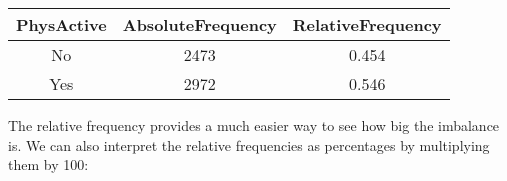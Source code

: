\documentclass[]{book}
\newenvironment{Shaded}{\begin{snugshade}}{\end{snugshade}}
\newcommand{\KeywordTok}[1]{\textcolor[rgb]{0.13,0.29,0.53}{\textbf{#1}}}
\newcommand{\DataTypeTok}[1]{\textcolor[rgb]{0.13,0.29,0.53}{#1}}
\newcommand{\DecValTok}[1]{\textcolor[rgb]{0.00,0.00,0.81}{#1}}
\newcommand{\StringTok}[1]{\textcolor[rgb]{0.31,0.60,0.02}{#1}}
\newcommand{\CommentTok}[1]{\textcolor[rgb]{0.56,0.35,0.01}{\textit{#1}}}
\newcommand{\OperatorTok}[1]{\textcolor[rgb]{0.81,0.36,0.00}{\textbf{#1}}}
\newcommand{\NormalTok}[1]{#1}
\theoremstyle{definition}
\theoremstyle{definition}
\theoremstyle{definition}
\theoremstyle{remark}
\begin{document}
\begin{longtable}[]{@{}ccc@{}}
\toprule
\begin{minipage}[b]{0.16\columnwidth}\centering\strut
PhysActive\strut
\end{minipage} & \begin{minipage}[b]{0.25\columnwidth}\centering\strut
AbsoluteFrequency\strut
\end{minipage} & \begin{minipage}[b]{0.25\columnwidth}\centering\strut
RelativeFrequency\strut
\end{minipage}\tabularnewline
\midrule
\endhead
\begin{minipage}[t]{0.16\columnwidth}\centering\strut
No\strut
\end{minipage} & \begin{minipage}[t]{0.25\columnwidth}\centering\strut
2473\strut
\end{minipage} & \begin{minipage}[t]{0.25\columnwidth}\centering\strut
0.454\strut
\end{minipage}\tabularnewline
\begin{minipage}[t]{0.16\columnwidth}\centering\strut
Yes\strut
\end{minipage} & \begin{minipage}[t]{0.25\columnwidth}\centering\strut
2972\strut
\end{minipage} & \begin{minipage}[t]{0.25\columnwidth}\centering\strut
0.546\strut
\end{minipage}\tabularnewline
\bottomrule
\end{longtable}

The relative frequency provides a much easier way to see how big the
imbalance is. We can also interpret the relative frequencies as
percentages by multiplying them by 100:

\begin{Shaded}
\end{Shaded}
\end{document}
